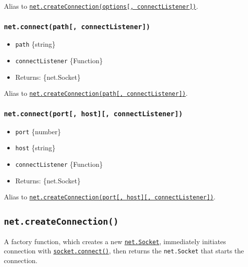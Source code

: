 Alias to
\hyperref[netcreateconnectionoptions-connectlistener]{\texttt{net.createConnection(options{[},\ connectListener{]})}}.

\subsubsection{\texorpdfstring{\texttt{net.connect(path{[},\ connectListener{]})}}{net.connect(path{[}, connectListener{]})}}\label{net.connectpath-connectlistener}

\begin{itemize}
\tightlist
\item
  \texttt{path} \{string\}
\item
  \texttt{connectListener} \{Function\}
\item
  Returns: \{net.Socket\}
\end{itemize}

Alias to
\hyperref[netcreateconnectionpath-connectlistener]{\texttt{net.createConnection(path{[},\ connectListener{]})}}.

\subsubsection{\texorpdfstring{\texttt{net.connect(port{[},\ host{]}{[},\ connectListener{]})}}{net.connect(port{[}, host{]}{[}, connectListener{]})}}\label{net.connectport-host-connectlistener}

\begin{itemize}
\tightlist
\item
  \texttt{port} \{number\}
\item
  \texttt{host} \{string\}
\item
  \texttt{connectListener} \{Function\}
\item
  Returns: \{net.Socket\}
\end{itemize}

Alias to
\hyperref[netcreateconnectionport-host-connectlistener]{\texttt{net.createConnection(port{[},\ host{]}{[},\ connectListener{]})}}.

\subsection{\texorpdfstring{\texttt{net.createConnection()}}{net.createConnection()}}\label{net.createconnection}

A factory function, which creates a new
\hyperref[class-netsocket]{\texttt{net.Socket}}, immediately initiates
connection with \hyperref[socketconnect]{\texttt{socket.connect()}},
then returns the \texttt{net.Socket} that starts the connection.

